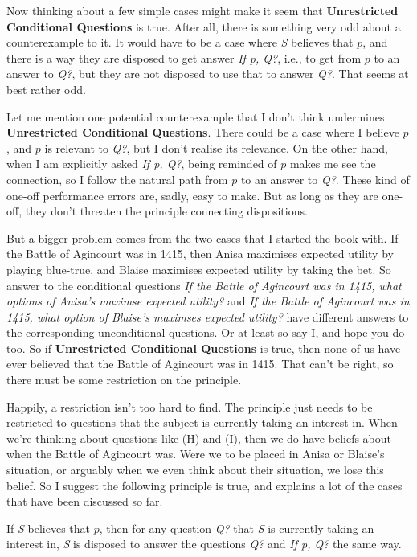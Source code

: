 \documentclass[11pt,]{book}
\providecommand{\tightlist}{%
  \setlength{\itemsep}{0pt}\setlength{\parskip}{0pt}}
\begin{document}
Now thinking about a few simple cases might make it seem that \textbf{Unrestricted Conditional Questions} is true. After all, there is something very odd about a counterexample to it. It would have to be a case where \emph{S} believes that \(p\), and there is a way they are disposed to get answer \emph{If p, Q?}, i.e., to get from \(p\) to an answer to \emph{Q?}, but they are not disposed to use that to answer \emph{Q?}. That seems at best rather odd.

Let me mention one potential counterexample that I don't think undermines \textbf{Unrestricted Conditional Questions}. There could be a case where I believe \(p\), and \(p\) is relevant to \emph{Q?}, but I don't realise its relevance. On the other hand, when I am explicitly asked \emph{If p, Q?}, being reminded of \(p\) makes me see the connection, so I follow the natural path from \(p\) to an answer to \emph{Q?}. These kind of one-off performance errors are, sadly, easy to make. But as long as they are one-off, they don't threaten the principle connecting dispositions.

But a bigger problem comes from the two cases that I started the book with. If the Battle of Agincourt was in 1415, then Anisa maximises expected utility by playing blue-true, and Blaise maximises expected utility by taking the bet. So answer to the conditional questions \emph{If the Battle of Agincourt was in 1415, what options of Anisa's maximse expected utility?} and \emph{If the Battle of Agincourt was in 1415, what option of Blaise's maximses expected utility?} have different answers to the corresponding unconditional questions. Or at least so say I, and hope you do too. So if \textbf{Unrestricted Conditional Questions} is true, then none of us have ever believed that the Battle of Agincourt was in 1415. That can't be right, so there must be some restriction on the principle.

Happily, a restriction isn't too hard to find. The principle just needs to be restricted to questions that the subject is currently taking an interest in. When we're thinking about questions like (H) and (I), then we do have beliefs about when the Battle of Agincourt was. Were we to be placed in Anisa or Blaise's situation, or arguably when we even think about their situation, we lose this belief. So I suggest the following principle is true, and explains a lot of the cases that have been discussed so far.

\begin{description}
\tightlist
\item[Relevant Conditional Questions]
If \emph{S} believes that \(p\), then for any question \emph{Q?} that \emph{S} is currently taking an interest in, \emph{S} is disposed to answer the questions \emph{Q?} and \emph{If p, Q?} the same way.
\end{description}
\end{document}

